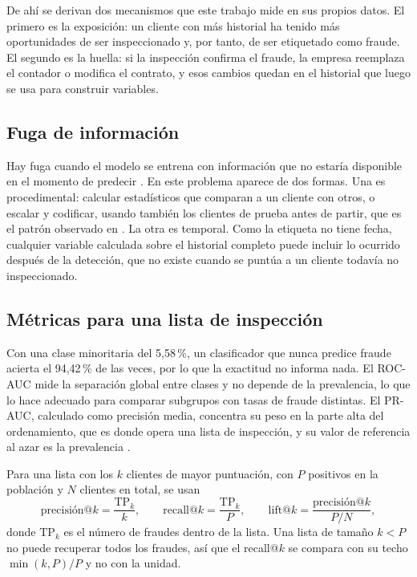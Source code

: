 De ahí se derivan dos mecanismos que este trabajo mide en sus propios datos. El primero es
la exposición: un cliente con más historial ha tenido más oportunidades de ser
inspeccionado y, por tanto, de ser etiquetado como fraude. El segundo es la huella: si la
inspección confirma el fraude, la empresa reemplaza el contador o modifica el contrato, y esos
cambios quedan en el historial que luego se usa para construir variables.

\subsection{Fuga de información}

Hay fuga cuando el modelo se entrena con información que no estaría disponible en el momento
de predecir \parencite{kaufman2012}. En este problema aparece de dos formas. Una es
procedimental: calcular estadísticos que comparan a un cliente con otros, o escalar y
codificar, usando también los clientes de prueba antes de partir, que es el patrón observado
en \textcite{oprea2022}. La otra es temporal. Como la etiqueta no tiene fecha, cualquier
variable calculada sobre el historial completo puede incluir lo ocurrido después de la
detección, que no existe cuando se puntúa a un cliente todavía no inspeccionado.

\subsection{Métricas para una lista de inspección}

Con una clase minoritaria del 5,58\,\%, un clasificador que nunca predice fraude acierta el
94,42\,\% de las veces, por lo que la exactitud no informa nada. El ROC-AUC mide la
separación global entre clases y no depende de la prevalencia, lo que lo hace adecuado para
comparar subgrupos con tasas de fraude distintas. El PR-AUC, calculado como precisión media,
concentra su peso en la parte alta del ordenamiento, que es donde opera una lista de
inspección, y su valor de referencia al azar es la prevalencia \parencite{saito2015}.

Para una lista con los $k$ clientes de mayor puntuación, con $P$ positivos en la población
y $N$ clientes en total, se usan
\begin{equation}
  \text{precisión@}k = \frac{\text{TP}_k}{k}, \qquad
  \text{recall@}k = \frac{\text{TP}_k}{P}, \qquad
  \text{lift@}k = \frac{\text{precisión@}k}{P/N},
\end{equation}
donde $\text{TP}_k$ es el número de fraudes dentro de la lista. Una lista de tamaño $k < P$
no puede recuperar todos los fraudes, así que el recall@$k$ se compara con su techo
$\min(k, P)/P$ y no con la unidad.

